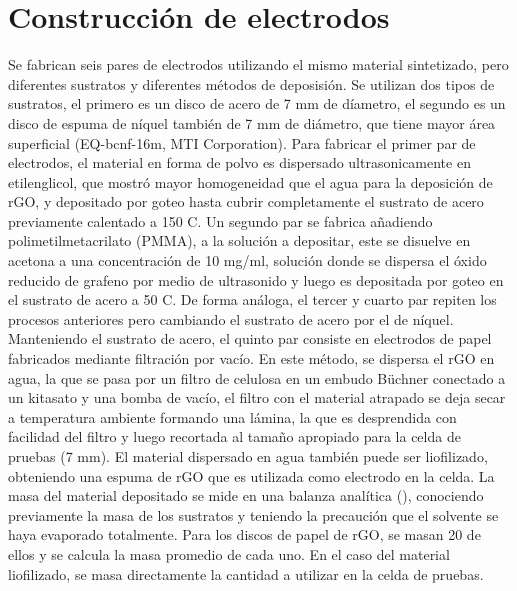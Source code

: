 \section{Construcción de electrodos}
Se fabrican seis pares de electrodos utilizando el mismo material sintetizado, pero diferentes sustratos y diferentes métodos de deposisión. Se utilizan dos tipos de sustratos, el primero es un disco de acero de 7 mm de díametro, el segundo es un disco de espuma de níquel también de 7 mm de diámetro, que tiene mayor área superficial (EQ-bcnf-16m, MTI Corporation). Para fabricar el primer par de electrodos, el material en forma de polvo es dispersado ultrasonicamente en etilenglicol, que mostró mayor homogeneidad que el agua para la deposición de rGO, y depositado por goteo hasta cubrir completamente el sustrato de acero previamente calentado a 150 \degree C. Un segundo par se fabrica añadiendo polimetilmetacrilato (PMMA), a la solución a depositar, este se disuelve en acetona a una concentración de 10 mg/ml, solución donde se dispersa el óxido reducido de grafeno por medio de ultrasonido y luego es depositada por goteo en el sustrato de acero a 50 \degree C. De forma análoga, el tercer y cuarto par repiten los procesos anteriores pero cambiando el sustrato de acero por el de níquel. Manteniendo el sustrato de acero, el quinto par consiste en electrodos de papel fabricados mediante filtración por vacío. En este método, se dispersa el rGO en agua, la que se pasa por un filtro de celulosa en un embudo Büchner conectado a un kitasato y una bomba de vacío, el filtro con el material atrapado se deja secar a temperatura ambiente formando una lámina, la que es desprendida con facilidad del filtro y luego recortada al tamaño apropiado para la celda de pruebas (7 mm). El material dispersado en agua también puede ser liofilizado, obteniendo una espuma de rGO que es utilizada como electrodo en la celda.
La masa del material depositado se mide en una balanza analítica (), conociendo previamente la masa de los sustratos y teniendo la precaución que el solvente se haya evaporado totalmente. Para los discos de papel de rGO, se masan 20 de ellos y se calcula la masa promedio de cada uno. En el caso del material liofilizado, se masa directamente la cantidad a utilizar en la celda de pruebas.


